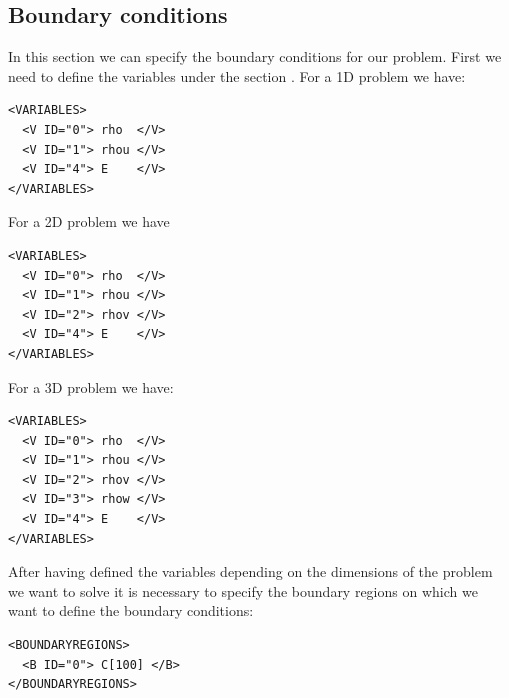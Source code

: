 \subsection*{Boundary conditions}
In this section we can specify the boundary conditions for our problem.
First we need to define the variables under the section .
For a 1D problem we have:
\begin{lstlisting}[style=XmlStyle]
<VARIABLES>
  <V ID="0"> rho  </V>
  <V ID="1"> rhou </V>
  <V ID="4"> E    </V>
</VARIABLES>
\end{lstlisting}

For a 2D problem we have
\begin{lstlisting}[style=XmlStyle]
<VARIABLES>
  <V ID="0"> rho  </V>
  <V ID="1"> rhou </V>
  <V ID="2"> rhov </V>
  <V ID="4"> E    </V>
</VARIABLES>
\end{lstlisting}

For a 3D problem we have:
\begin{lstlisting}[style=XmlStyle]
<VARIABLES>
  <V ID="0"> rho  </V>
  <V ID="1"> rhou </V>
  <V ID="2"> rhov </V>
  <V ID="3"> rhow </V>
  <V ID="4"> E    </V>
</VARIABLES>
\end{lstlisting}

After having defined the variables depending on the dimensions of the problem we want to solve
it is necessary to specify the boundary regions on which we want to define the boundary conditions:
\begin{lstlisting}[style=XmlStyle]
<BOUNDARYREGIONS>
  <B ID="0"> C[100] </B>
</BOUNDARYREGIONS>
\end{lstlisting}

